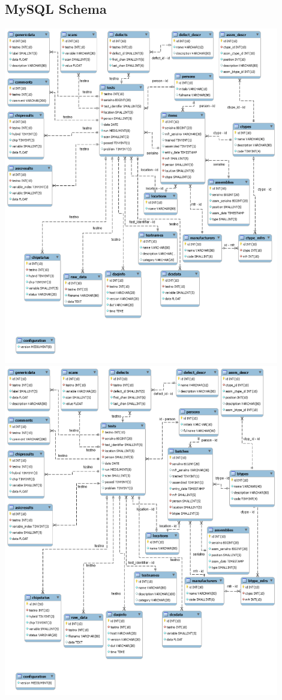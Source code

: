 \begin{appendices}
	\chapter{MySQL Schema}
	\label{app:mysqlSchema}
	\includegraphics[width=0.9\textwidth]{img/mysql_schema_items.png}\\
	\newpage
	\includegraphics[width=0.9\textwidth]{img/mysql_schema_batches.png}\\

\end{appendices}

